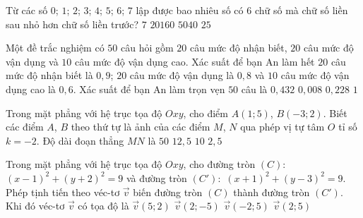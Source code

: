 \begin{ex}%
Từ các số $0$; $1$; $2$; $3$; $4$; $5$; $6$; $7$ lập được bao nhiêu số có $6$ chữ số mà chữ số liền sau nhỏ hơn chữ số liền trước?
\choice
{\True $7$}
{$20160$}
{$5040$}
{$25$}
\end{ex}

\begin{ex}%
Một đề trắc nghiệm có $50$ câu hỏi gồm $20$ câu mức độ nhận biết, $20$ câu mức độ vận dụng và $10$ câu mức độ vận dụng cao. Xác suất để bạn An làm hết $20$ câu mức độ nhận biết là $0,9$; $20$ câu mức độ vận dụng là $0,8$ và $10$ câu mức độ vận dụng cao là $0,6$. Xác suất để bạn An làm trọn vẹn $50$ câu là
\choice
{\True $0,432$}
{$0,008$}
{$0,228$}
{$1$}
\end{ex}

\begin{ex}%
Trong mặt phẳng với hệ trục tọa độ $Oxy$, cho điểm $A(1;5)$, $B(-3;2)$. Biết các điểm $A$, $B$ theo thứ tự là ảnh của các điểm $M$, $N$ qua phép vị tự tâm $O$ tỉ số $k=-2$. Độ dài đoạn thẳng $MN$ là
\choice
{$50$}
{$12,5$}
{$10$}
{\True $2,5$}
\end{ex}

\begin{ex}%
Trong mặt phẳng với hệ trục tọa độ $Oxy$, cho đường tròn $(C):$ $(x-1)^2+(y+2)^2=9$ và đường tròn $(C'):$ $(x+1)^2+(y-3)^2=9$. Phép tịnh tiến theo véc-tơ $\overrightarrow{v}$ biến đường tròn $(C)$ thành đường tròn $(C')$. Khi đó véc-tơ $\overrightarrow{v}$ có tọa độ là 
\choice
{$\overrightarrow{v}(5;2)$}
{$\overrightarrow{v}(2;-5)$}
{\True $\overrightarrow{v}(-2;5)$}
{$\overrightarrow{v}(2;5)$}
\end{ex}

